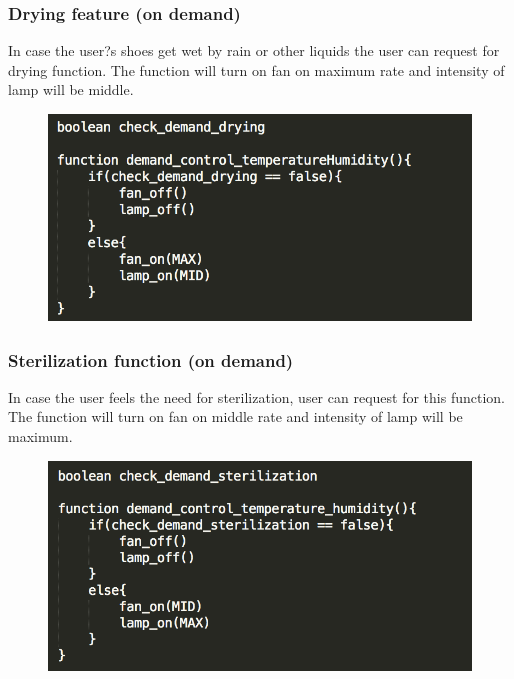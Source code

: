 \documentclass[conference]{IEEEtran}
\begin{document}
\subsubsection{Drying feature (on demand)}
In case the user?s shoes get wet by rain or other liquids the user can request for drying function. The function will turn on fan on maximum rate and intensity of lamp will be middle.
\begin{figure}[htbp]
\begin{center}
    \includegraphics[scale=0.6]{optimization2}
    \label{fig:label}
\end{center}
\end{figure}
\subsubsection{Sterilization function (on demand)}
In case the user feels the need for sterilization, user can request for this function. The function will turn on fan on middle rate and intensity of lamp will be maximum.
\begin{figure}[htbp]
\begin{center}
    \includegraphics[scale=0.6]{optimization3}
    \label{fig:label}
\end{center}
\end{figure}
\end{document}
